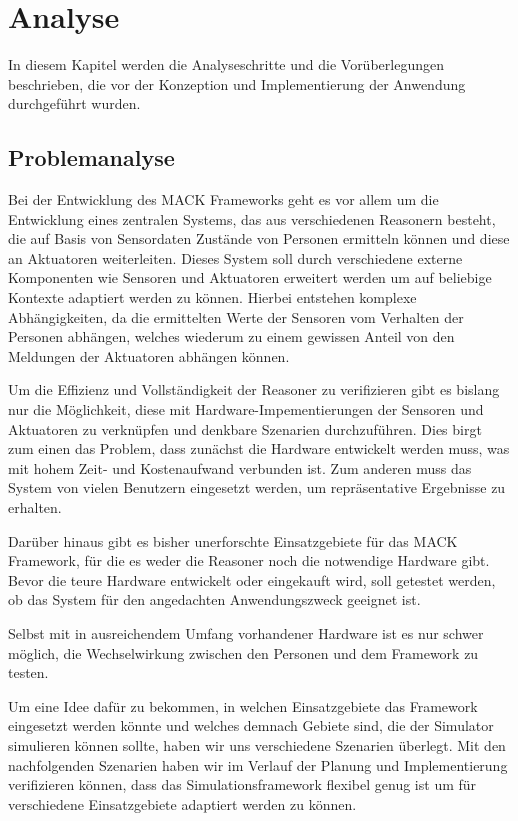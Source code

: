 \chapter{Analyse}\label{chapter:analysis}
In diesem Kapitel werden die Analyseschritte und die Vorüberlegungen beschrieben, die vor der Konzeption und Implementierung der Anwendung durchgeführt wurden.


\section{Problemanalyse}\label{sec:problem_ana}
Bei der Entwicklung des MACK Frameworks geht es vor allem um die Entwicklung eines zentralen Systems, das aus verschiedenen Reasonern besteht, die auf Basis von Sensordaten Zustände von Personen ermitteln können und diese an Aktuatoren weiterleiten. Dieses System soll durch verschiedene externe Komponenten wie Sensoren und Aktuatoren erweitert werden um auf beliebige Kontexte adaptiert werden zu können. Hierbei entstehen komplexe Abhängigkeiten, da die ermittelten Werte der Sensoren vom Verhalten der Personen abhängen, welches wiederum zu einem gewissen Anteil von den Meldungen der Aktuatoren abhängen können.

Um die Effizienz und Vollständigkeit der Reasoner zu verifizieren gibt es bislang nur die Möglichkeit, diese mit Hardware-Impementierungen der Sensoren und Aktuatoren zu verknüpfen und denkbare Szenarien durchzuführen. Dies birgt zum einen das Problem, dass zunächst die Hardware entwickelt werden muss, was mit hohem Zeit- und Kostenaufwand verbunden ist. Zum anderen muss das System von vielen Benutzern eingesetzt werden, um repräsentative Ergebnisse zu erhalten.

Darüber hinaus gibt es bisher unerforschte Einsatzgebiete für das MACK Framework, für die es weder die Reasoner noch die notwendige Hardware gibt. Bevor die teure Hardware entwickelt oder eingekauft wird, soll getestet werden, ob das System für den angedachten Anwendungszweck geeignet ist.

Selbst mit in ausreichendem Umfang vorhandener Hardware ist es nur schwer möglich, die Wechselwirkung zwischen den Personen und dem Framework zu testen.

Um eine Idee dafür zu bekommen, in welchen Einsatzgebiete das Framework eingesetzt werden könnte und welches demnach Gebiete sind, die der Simulator simulieren können sollte, haben wir uns verschiedene Szenarien überlegt. Mit den nachfolgenden Szenarien haben wir im Verlauf der Planung und Implementierung verifizieren können, dass das Simulationsframework flexibel genug ist um für verschiedene Einsatzgebiete adaptiert werden zu können.

